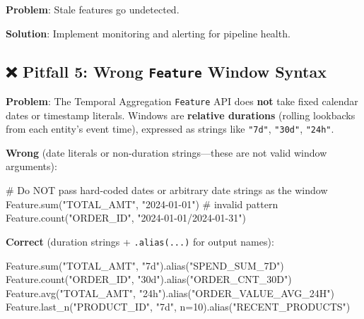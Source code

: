 \documentclass[
  letterpaper,
  DIV=11,
  numbers=noendperiod]{scrreprt}
\newenvironment{Shaded}{\begin{snugshade}}{\end{snugshade}}
\newcommand{\BuiltInTok}[1]{\textcolor[rgb]{0.00,0.23,0.31}{#1}}
\newcommand{\CommentTok}[1]{\textcolor[rgb]{0.37,0.37,0.37}{#1}}
\newcommand{\DecValTok}[1]{\textcolor[rgb]{0.68,0.00,0.00}{#1}}
\newcommand{\NormalTok}[1]{\textcolor[rgb]{0.00,0.23,0.31}{#1}}
\newcommand{\OperatorTok}[1]{\textcolor[rgb]{0.37,0.37,0.37}{#1}}
\newcommand{\StringTok}[1]{\textcolor[rgb]{0.13,0.47,0.30}{#1}}
\begin{document}
\textbf{Problem}: Stale features go undetected.

\textbf{Solution}: Implement monitoring and alerting for pipeline
health.

\hypertarget{pitfall-5-wrong-feature-window-syntax}{%
\subsection{\texorpdfstring{❌ Pitfall 5: Wrong \texttt{Feature} Window
Syntax}{❌ Pitfall 5: Wrong Feature Window Syntax}}\label{pitfall-5-wrong-feature-window-syntax}}

\textbf{Problem}: The Temporal Aggregation \texttt{Feature} API does
\textbf{not} take fixed calendar dates or timestamp literals. Windows
are \textbf{relative durations} (rolling lookbacks from each entity's
event time), expressed as strings like \texttt{"7d"}, \texttt{"30d"},
\texttt{"24h"}.

\textbf{Wrong} (date literals or non-duration strings---these are not
valid window arguments):

\begin{Shaded}
\begin{Highlighting}[]
\CommentTok{\# Do NOT pass hard{-}coded dates or arbitrary date strings as the window}
\NormalTok{Feature.}\BuiltInTok{sum}\NormalTok{(}\StringTok{"TOTAL\_AMT"}\NormalTok{, }\StringTok{"2024{-}01{-}01"}\NormalTok{)       }\CommentTok{\# invalid pattern}
\NormalTok{Feature.count(}\StringTok{"ORDER\_ID"}\NormalTok{, }\StringTok{"2024{-}01{-}01/2024{-}01{-}31"}\NormalTok{)}
\end{Highlighting}
\end{Shaded}

\textbf{Correct} (duration strings + \texttt{.alias(...)} for output
names):

\begin{Shaded}
\begin{Highlighting}[]
\NormalTok{Feature.}\BuiltInTok{sum}\NormalTok{(}\StringTok{"TOTAL\_AMT"}\NormalTok{, }\StringTok{"7d"}\NormalTok{).alias(}\StringTok{"SPEND\_SUM\_7D"}\NormalTok{)}
\NormalTok{Feature.count(}\StringTok{"ORDER\_ID"}\NormalTok{, }\StringTok{"30d"}\NormalTok{).alias(}\StringTok{"ORDER\_CNT\_30D"}\NormalTok{)}
\NormalTok{Feature.avg(}\StringTok{"TOTAL\_AMT"}\NormalTok{, }\StringTok{"24h"}\NormalTok{).alias(}\StringTok{"ORDER\_VALUE\_AVG\_24H"}\NormalTok{)}
\NormalTok{Feature.last\_n(}\StringTok{"PRODUCT\_ID"}\NormalTok{, }\StringTok{"7d"}\NormalTok{, n}\OperatorTok{=}\DecValTok{10}\NormalTok{).alias(}\StringTok{"RECENT\_PRODUCTS"}\NormalTok{)}
\end{Highlighting}
\end{Shaded}
\end{document}
